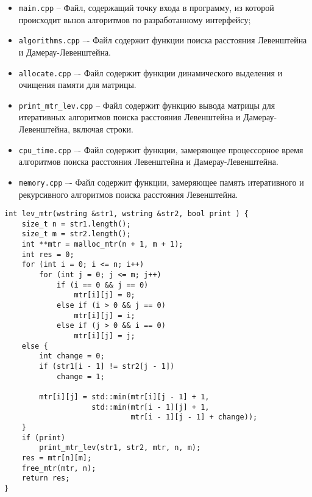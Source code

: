 \begin{itemize}
	\item \texttt{main.cpp} -- Файл, содержащий точку входа в программу, из которой происходит вызов алгоритмов по разработанному интерфейсу;
	\item \texttt{algorithms.cpp} –- Файл содержит функции поиска расстояния Левенштейна и Дамерау-Левенштейна.
	\item \texttt{allocate.cpp} –- Файл содержит функции динамического выделения и очищения памяти для матрицы.
	\item \texttt{print\_mtr\_lev.cpp} -- Файл содержит функцию вывода матрицы для итеративных алгоритмов поиска расстояния Левенштейна и Дамерау-Левенштейна, включая строки.
	\item \texttt{cpu\_time.cpp} –- Файл содержит функции, замеряющее процессорное время алгоритмов поиска расстояния Левенштейна и Дамерау-Левенштейна.
	\item \texttt{memory.cpp} –- Файл содержит функции, замеряющее память итеративного и рекурсивного алгоритмов поиска расстояния Левенштейна.
\end{itemize}

\clearpage

\begin{lstlisting}[label=lst:lev_mtr,caption=Функция нахождения расстояния Левенштейна с использованием матрицы]
int lev_mtr(wstring &str1, wstring &str2, bool print ) {
	size_t n = str1.length();
	size_t m = str2.length();
	int **mtr = malloc_mtr(n + 1, m + 1);
	int res = 0;
	for (int i = 0; i <= n; i++)
		for (int j = 0; j <= m; j++)
			if (i == 0 && j == 0)
				mtr[i][j] = 0;
			else if (i > 0 && j == 0)
				mtr[i][j] = i;
			else if (j > 0 && i == 0)
				mtr[i][j] = j;
	else {
		int change = 0;
		if (str1[i - 1] != str2[j - 1])
			change = 1;
		
		mtr[i][j] = std::min(mtr[i][j - 1] + 1,
					std::min(mtr[i - 1][j] + 1,
							 mtr[i - 1][j - 1] + change));
	}
	if (print)
		print_mtr_lev(str1, str2, mtr, n, m);
	res = mtr[n][m];
	free_mtr(mtr, n);
	return res;
}
\end{lstlisting}

\clearpage

